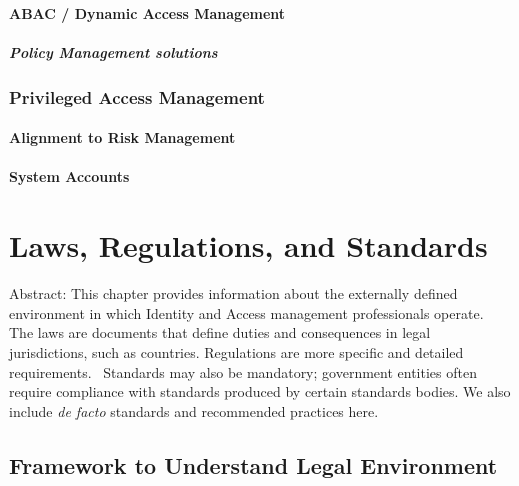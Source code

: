 \hypertarget{abac-dynamic-access-management}{%
\subsubsection{ABAC / Dynamic Access
Management}\label{abac-dynamic-access-management}}

\hypertarget{policy-management-solutions}{%
\paragraph{Policy Management
solutions}\label{policy-management-solutions}}

\hypertarget{privileged-access-management}{%
\subsection{Privileged Access
Management}\label{privileged-access-management}}

\hypertarget{alignment-to-risk-management}{%
\subsubsection{Alignment to Risk
Management}\label{alignment-to-risk-management}}

\hypertarget{system-accounts}{%
\subsubsection{System Accounts}\label{system-accounts}}

\hypertarget{laws-regulations-and-standards}{%
\chapter{Laws, Regulations, and
Standards}\label{laws-regulations-and-standards}}

Abstract: This chapter provides information about the externally defined
environment in which Identity and Access management professionals
operate.~ The laws are documents that define duties and consequences in
legal jurisdictions, such as countries. Regulations are more specific
and detailed requirements.~ Standards may also be mandatory; government
entities often require compliance with standards produced by certain
standards bodies. We also include \emph{de facto} standards and
recommended practices here.

\hypertarget{framework-to-understand-legal-environment}{%
\section{Framework to Understand Legal
Environment}\label{framework-to-understand-legal-environment}}

